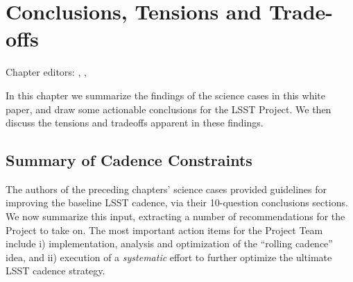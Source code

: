 \chapter[Conclusions, Tensions and Trade-offs]{Conclusions, Tensions and Trade-offs}
\def\chpname{tradeoffs}\label{chp:\chpname}

Chapter editors:
,
,


In this chapter we summarize the findings of the science cases in this
white paper, and draw some actionable conclusions for the LSST Project.
We then discuss the tensions and tradeoffs apparent in these findings.


\section{Summary of Cadence Constraints}


The authors of the preceding chapters' science cases provided guidelines
for improving the baseline LSST cadence, via their 10-question
conclusions sections.  We now summarize this input, extracting a number
of recommendations for the Project to take on. The most important action
items for the Project Team include i) implementation, analysis and
optimization of the ``rolling cadence'' idea, and ii) execution of a
{\it systematic} effort to further optimize the ultimate LSST cadence
strategy.

